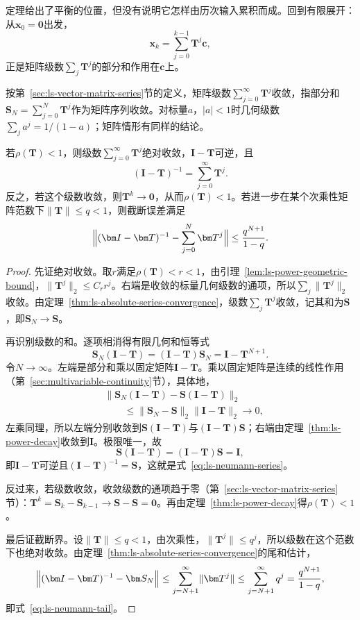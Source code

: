 定理给出了平衡的位置，但没有说明它怎样由历次输入累积而成。回到有限展开：从$\bm x_0=\bm0$出发，
\[
 \bm x_k=\sum_{j=0}^{k-1}\bm T^j\bm c ,
\]
正是矩阵级数$\sum_j\bm T^j$的部分和作用在$\bm c$上。

按第~\ref{sec:ls-vector-matrix-series}节的定义，矩阵级数$\sum_{j=0}^{\infty}\bm T^j$收敛，指部分和$\bm S_N=\sum_{j=0}^N\bm T^j$作为矩阵序列收敛。对标量$a$，$|a|<1$时几何级数$\sum_ja^j=1/(1-a)$；矩阵情形有同样的结论。

\begin{theorem}[Neumann级数与逆]
\label{thm:ls-neumann}
若$\rho(\bm T)<1$，则级数$\sum_{j=0}^{\infty}\bm T^j$绝对收敛，$\bm I-\bm T$可逆，且
\begin{equation}
 (\bm I-\bm T)^{-1}=\sum_{j=0}^{\infty}\bm T^j .
 \label{eq:ls-neumann-series}
\end{equation}
反之，若这个级数收敛，则$\bm T^k\to\bm0$，从而$\rho(\bm T)<1$。若进一步在某个次乘性矩阵范数下$\lVert\bm T\rVert\leq q<1$，则截断误差满足
\begin{equation}
 \Bigl\lVert(\bm I-\bm T)^{-1}-\sum_{j=0}^{N}\bm T^j\Bigr\rVert\leq\frac{q^{N+1}}{1-q}.
 \label{eq:ls-neumann-tail}
\end{equation}
\end{theorem}
\begin{proof}
先证绝对收敛。取$r$满足$\rho(\bm T)<r<1$，由引理~\ref{lem:ls-power-geometric-bound}，$\lVert\bm T^j\rVert_2\leq C_rr^j$。右端是收敛的标量几何级数的通项，所以$\sum_j\lVert\bm T^j\rVert_2$收敛。由定理~\ref{thm:ls-absolute-series-convergence}，级数$\sum_j\bm T^j$收敛，记其和为$\bm S$，即$\bm S_N\to\bm S$。

再识别级数的和。逐项相消得有限几何和恒等式
\[
 \bm S_N(\bm I-\bm T)=(\bm I-\bm T)\bm S_N=\bm I-\bm T^{N+1}.
\]
令$N\to\infty$。左端是部分和乘以固定矩阵$\bm I-\bm T$。乘以固定矩阵是连续的线性作用（第~\ref{sec:multivariable-continuity}节），具体地，
\[
\begin{aligned}
 &\lVert\bm S_N(\bm I-\bm T)-\bm S(\bm I-\bm T)\rVert_2\\
 &\qquad\leq\lVert\bm S_N-\bm S\rVert_2\lVert\bm I-\bm T\rVert_2\to0 ,
\end{aligned}
\]
左乘同理，所以左端分别收敛到$\bm S(\bm I-\bm T)$与$(\bm I-\bm T)\bm S$；右端由定理~\ref{thm:ls-power-decay}收敛到$\bm I$。极限唯一，故
\[
 \bm S(\bm I-\bm T)=(\bm I-\bm T)\bm S=\bm I ,
\]
即$\bm I-\bm T$可逆且$(\bm I-\bm T)^{-1}=\bm S$，这就是式~\eqref{eq:ls-neumann-series}。

反过来，若级数收敛，收敛级数的通项趋于零（第~\ref{sec:ls-vector-matrix-series}节）：$\bm T^k=\bm S_k-\bm S_{k-1}\to\bm S-\bm S=\bm0$。再由定理~\ref{thm:ls-power-decay}得$\rho(\bm T)<1$。

最后证截断界。设$\lVert\bm T\rVert\leq q<1$，由次乘性，$\lVert\bm T^j\rVert\leq q^j$，所以级数在这个范数下也绝对收敛。由定理~\ref{thm:ls-absolute-series-convergence}的尾和估计，
\[
 \Bigl\lVert(\bm I-\bm T)^{-1}-\bm S_N\Bigr\rVert
 \leq\sum_{j=N+1}^{\infty}\lVert\bm T^j\rVert
 \leq\sum_{j=N+1}^{\infty}q^j=\frac{q^{N+1}}{1-q},
\]
即式~\eqref{eq:ls-neumann-tail}。
\end{proof}
